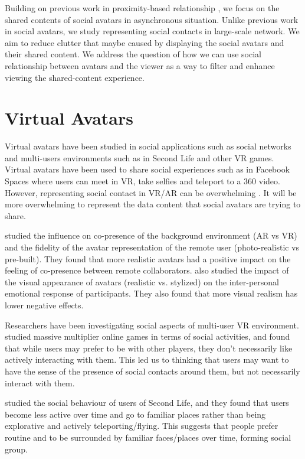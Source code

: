 Building on previous work in proximity-based relationship \cite{Sousa2016}, we focus on the shared contents of social avatars in asynchronous situation. Unlike previous work in social avatars, we study representing social contacts in large-scale network. We aim to reduce clutter that maybe caused by displaying the social avatars and their shared content. We address the question of how we can use social relationship between avatars and the viewer as a way to filter and enhance viewing the shared-content experience. 


\section{Virtual Avatars}

Virtual avatars have been studied in social applications such as social networks and multi-users environments such as in Second Life \cite{Kaplan2009}  and other VR games. Virtual avatars have been used to share social experiences such as in Facebook Spaces\cite{Facebook} where users can meet in VR, take selfies and teleport to a 360 video. However, representing social contact in VR/AR can be overwhelming \cite{Nassani2017b}. It will be more overwhelming to represent the data content that social avatars are trying to share. 

\cite{Jo2016} studied the influence on co-presence of the background environment (AR vs VR) and the fidelity of the avatar representation of the remote user (photo-realistic vs pre-built). They found that more realistic avatars had a positive impact on the feeling of co-presence between remote collaborators. \cite{Volante2016} also studied the impact of the visual appearance of avatars (realistic vs. stylized) on the inter-personal emotional response of participants. They also found that more visual realism has lower negative effects. 

Researchers  have been investigating social aspects of multi-user VR environment. \cite{Ducheneaut2006} studied massive multiplier online games in terms of social activities, and  found that while users may prefer to be with other players, they don't necessarily like actively interacting with them. This led us to thinking that users may want to have the sense of the presence of social contacts around them, but not necessarily interact with them.

\cite{Harris2009} studied the social behaviour of users of Second Life, and they found that users become less active over time and go to familiar places rather than being explorative and actively teleporting/flying. This suggests that people prefer routine and to be surrounded by familiar faces/places over time, forming social group.

